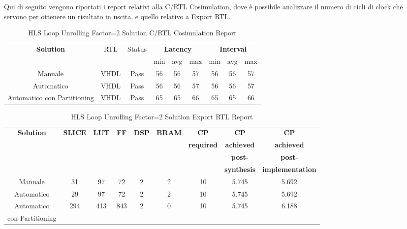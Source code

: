 Qui di seguito vengono riportati i report relativi alla C/RTL Cosimulation, dove è possibile analizzare il numero di cicli di clock che servono per ottenere un risultato in uscita, e quello relativo a Export RTL.

\begin{table}[H]
    \centering
    \begin{tabular}{|c|c|c|c|c|c|c|c|c|}
        \hline
        \multicolumn{1}{|c|}{\textbf{Solution}} & \multicolumn{1}{|c|}{RTL} & \multicolumn{1}{|c|}{Status} & \multicolumn{3}{c|}{\textbf{Latency}} & \multicolumn{3}{c|}{\textbf{Interval}} \\
        & &  & min & avg & max & min & avg & max \\
        \hline
        Manuale & VHDL & Pass & 56 & 56 & 57 & 56 & 56 & 57 \\
        \hline
        Automatico & VHDL & Pass & 56 & 56 & 57 & 56 & 56 & 57 \\
        \hline
        Automatico con Partitioning & VHDL & Pass & 65 & 65 & 66 & 65 & 65 & 66 \\
        \hline
    \end{tabular}
    \caption{HLS Loop Unrolling Factor=2 Solution C/RTL Cosimulation Report }
    \label{tab:hls-loop-unrolling-factor2-solution-cosimulation-report}
\end{table}

\begin{table}[H]
    \centering
    \begin{tabular}{|c|c|c|c|c|c|c|c|c|}
        \hline
        \textbf{Solution} & \textbf{SLICE} & \textbf{LUT} & \textbf{FF} & \textbf{DSP} & \textbf{BRAM} & \textbf{CP} & \textbf{CP} & \textbf{CP} \\
        & & & & & & \textbf{required} & \textbf{achieved} & \textbf{achieved}\\
        & & & & & & & \textbf{post-} & \textbf{post-}\\
        & & & & & & & \textbf{synthesis} & \textbf{implementation}\\
        \hline
        Manuale & 31 & 97 & 72 & 2 & 2 & 10 & 5.745 & 5.692 \\
        \hline
        Automatico & 29 & 97 & 72 & 2 & 2 & 10 & 5.745 & 5.692 \\
        \hline
        Automatico  & 294 & 413 & 843 & 2 & 0 & 10 & 5.745 & 6.188 \\
        con Partitioning & & & & & & & & \\
        \hline
    \end{tabular}
    \caption{HLS Loop Unrolling Factor=2 Solution Export RTL Report}
    \label{tab:vivado-loop-unrolling-factor2-solution-export-rtl-report}
\end{table}


